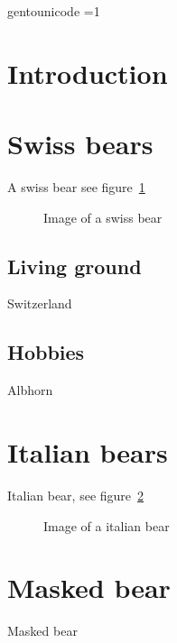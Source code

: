  \ifdefined\directlua
 \pdfvariable gentounicode =1
 \protected\def\pdfglyphtounicode {\pdfextension glyphtounicode } 
 
 \fi
\tableofcontents

\listoffigures

\newpage

\section{Introduction}


\section{Swiss bears}

A swiss bear see figure~\ref{fig:swissbear}

\begin{figure}
\caption{Image of a swiss bear\label{fig:swissbear}}
\end{figure}

\subsection{Living ground}

Switzerland

\subsection{Hobbies}

Albhorn

\section{Italian bears}

Italian bear, see figure~\ref{fig:italianbear}

\begin{figure}
\caption{Image of a italian bear\label{fig:italianbear}}
\end{figure}

\section{Masked bear}

Masked bear


